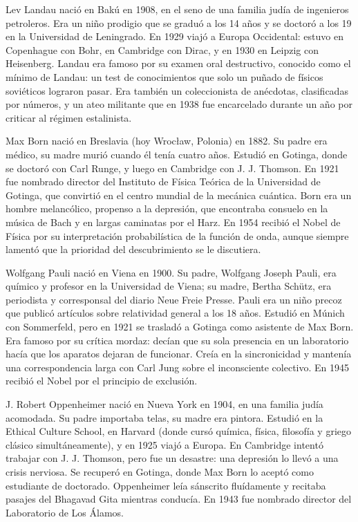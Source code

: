 \documentclass[11pt,a4paper]{article}
\begin{document}
Lev Landau nació en Bakú en 1908, en el seno de una familia judía de ingenieros petroleros. Era un niño prodigio que se graduó a los 14 años y se doctoró a los 19 en la Universidad de Leningrado. En 1929 viajó a Europa Occidental: estuvo en Copenhague con Bohr, en Cambridge con Dirac, y en 1930 en Leipzig con Heisenberg. Landau era famoso por su examen oral destructivo, conocido como el mínimo de Landau: un test de conocimientos que solo un puñado de físicos soviéticos lograron pasar. Era también un coleccionista de anécdotas, clasificadas por números, y un ateo militante que en 1938 fue encarcelado durante un año por criticar al régimen estalinista.

Max Born nació en Breslavia (hoy Wrocław, Polonia) en 1882. Su padre era médico, su madre murió cuando él tenía cuatro años. Estudió en Gotinga, donde se doctoró con Carl Runge, y luego en Cambridge con J. J. Thomson. En 1921 fue nombrado director del Instituto de Física Teórica de la Universidad de Gotinga, que convirtió en el centro mundial de la mecánica cuántica. Born era un hombre melancólico, propenso a la depresión, que encontraba consuelo en la música de Bach y en largas caminatas por el Harz. En 1954 recibió el Nobel de Física por su interpretación probabilística de la función de onda, aunque siempre lamentó que la prioridad del descubrimiento se le discutiera.

Wolfgang Pauli nació en Viena en 1900. Su padre, Wolfgang Joseph Pauli, era químico y profesor en la Universidad de Viena; su madre, Bertha Schütz, era periodista y corresponsal del diario Neue Freie Presse. Pauli era un niño precoz que publicó artículos sobre relatividad general a los 18 años. Estudió en Múnich con Sommerfeld, pero en 1921 se trasladó a Gotinga como asistente de Max Born. Era famoso por su crítica mordaz: decían que su sola presencia en un laboratorio hacía que los aparatos dejaran de funcionar. Creía en la sincronicidad y mantenía una correspondencia larga con Carl Jung sobre el inconsciente colectivo. En 1945 recibió el Nobel por el principio de exclusión.

J. Robert Oppenheimer nació en Nueva York en 1904, en una familia judía acomodada. Su padre importaba telas, su madre era pintora. Estudió en la Ethical Culture School, en Harvard (donde cursó química, física, filosofía y griego clásico simultáneamente), y en 1925 viajó a Europa. En Cambridge intentó trabajar con J. J. Thomson, pero fue un desastre: una depresión lo llevó a una crisis nerviosa. Se recuperó en Gotinga, donde Max Born lo aceptó como estudiante de doctorado. Oppenheimer leía sánscrito fluídamente y recitaba pasajes del Bhagavad Gita mientras conducía. En 1943 fue nombrado director del Laboratorio de Los Álamos.
\end{document}
